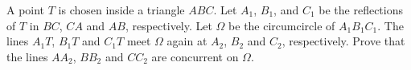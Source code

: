 A point $T$ is chosen inside a triangle $ABC$. Let $A_1$, $B_1$, and $C_1$ be the reflections of $T$ in $BC$, $CA$ and $AB$, respectively. Let $\Omega$ be the circumcircle of $A_1B_1C_1$. The lines $A_1T$, $B_1T$ and $C_1T$ meet $\Omega$ again at $A_2$, $B_2$ and $C_2$, respectively. Prove that the lines $AA_2$, $BB_2$ and $CC_2$ are concurrent on $\Omega$.